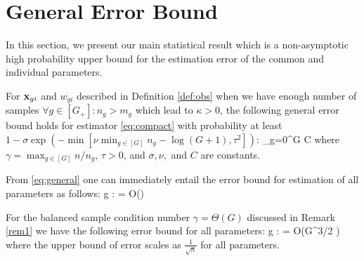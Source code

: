 \section{General Error Bound}
\label{sec:error}
In this section, we present our main statistical result which is a non-asymptotic high probability upper bound for the estimation error of the common and individual parameters.
\begin{theorem}
	\label{theo:calcub}
	For $\mathbf{x}_{gi}$ and $w_{gi}$ described in Definition \ref{def:obs} when we have enough number of samples $\forall g \in [G_+]: n_g > m_g$ which lead to $\kappa > 0$, the following general error bound holds for estimator \eqref{eq:compact} with probability at least $1 - \sigma \exp\left(-\min\left[\nu  \min_{g \in [G]} n_g - \log (G+1), \tau^2\right]\right) $: 
	{\small\be
	\label{eq:general}
	\sum_{g=0}^{G}  
	\leq C {\gamma} 
	\ee}where $\gamma = \max_{g \in [G]} n/n_g$, $\tau > 0$, and $\sigma, \nu,$ and $C$ are constants. 
\end{theorem}

\begin{corollary}
	\label{corr:single}
	From \eqref{eq:general} one can immediately entail the error bound for estimation of all parameters as follows:
	{\small\be
	\nr
	\forall g \in [G_+]: \quad {} =  O\left(\gamma {}\right)
	\ee}
\end{corollary}

\begin{example}
	For the balanced sample condition number $\gamma = \Theta(G)$ discussed in Remark \ref{rem1} we have the following error bound for all parameters:
	{\small\be 
		\forall g \in [G_+]:  =  O\left(G^{3/2} \right)
	\ee} 
	where the upper bound of error scales as $\frac{1}{\sqrt{n}}$ for all parameters. %
\end{example}


